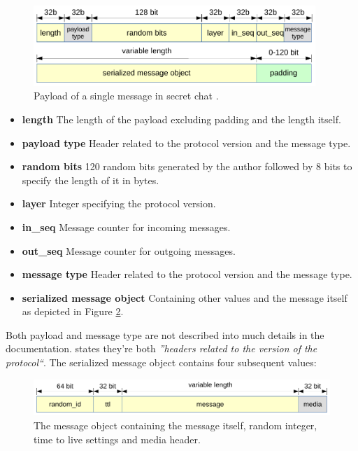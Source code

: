 \documentclass[thesis=M,english]{FITthesis}[2012/10/20]
\begin{document}
\begin{figure}[htb]
	\centering
	\includegraphics[width=0.95\textwidth]{secret-payload.pdf}
	\caption{Payload of a single message in secret chat \cite{telegram-aarhus}.}
	\label{img:crypto-secret-payload}
\end{figure}

\begin{itemize}
	\item  \textbf{length} The length of the payload excluding padding and the length itself.
	\item  \textbf{payload type} Header related to the protocol version and the message type.
	\item  \textbf{random bits} 120 random bits generated by the author followed by 8 bits to specify the length of it in bytes.
	\item  \textbf{layer} Integer specifying the protocol version.
	\item  \textbf{in\_seq} Message counter for incoming messages.
	\item  \textbf{out\_seq} Message counter for outgoing messages.
	\item  \textbf{message type} Header related to the protocol version and the message type.
	\item  \textbf{serialized message object} Containing other values and the message itself as depicted in Figure \ref{img:crypto-secret-messageobject}.
\end{itemize}

Both payload and message type are not described into much details in the documentation. \cite{telegram-aarhus} states they're both \emph{''headers related to the version of the protocol``}. The serialized message object contains four subsequent values:

\begin{figure}[htb]
	\centering
	\includegraphics[width=1\textwidth]{decrypted-message.pdf}
	\caption{The message object containing the message itself, random integer, time to live settings and media header.}
	\label{img:crypto-secret-messageobject}
\end{figure}
\end{document}
